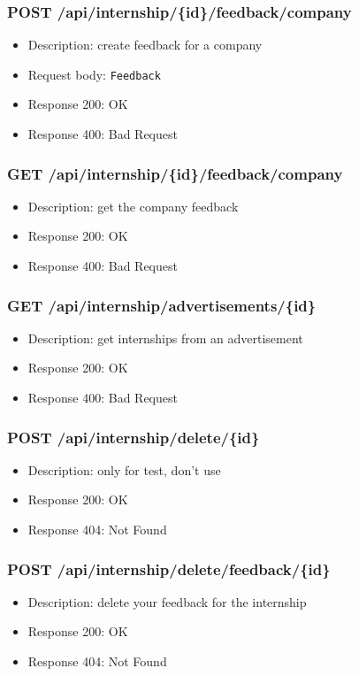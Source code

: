 \subsubsection{POST /api/internship/\{id\}/feedback/company}
\begin{itemize}
    \item Description: create feedback for a company
    \item Request body: \verb|Feedback|
    \item Response 200: OK
    \item Response 400: Bad Request
\end{itemize}

\subsubsection{GET /api/internship/\{id\}/feedback/company}
\begin{itemize}
    \item Description: get the company feedback
    \item Response 200: OK
    \item Response 400: Bad Request
\end{itemize}

\subsubsection{GET /api/internship/advertisements/\{id\}}
\begin{itemize}
    \item Description: get internships from an advertisement
    \item Response 200: OK
    \item Response 400: Bad Request
\end{itemize}

\subsubsection{POST /api/internship/delete/\{id\}}
\begin{itemize}
    \item Description: only for test, don't use
    \item Response 200: OK
    \item Response 404: Not Found
\end{itemize}

\subsubsection{POST /api/internship/delete/feedback/\{id\}}
\begin{itemize}
    \item Description: delete your feedback for the internship
    \item Response 200: OK
    \item Response 404: Not Found
\end{itemize}

